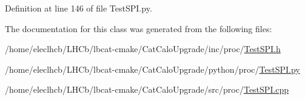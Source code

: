 Definition at line 146 of file Test\+S\+P\+I.\+py.



The documentation for this class was generated from the following files\+:\begin{DoxyCompactItemize}
\item 
/home/eleclhcb/\+L\+H\+Cb/lbcat-\/cmake/\+Cat\+Calo\+Upgrade/inc/proc/\hyperlink{TestSPI_8h}{Test\+S\+P\+I.\+h}\item 
/home/eleclhcb/\+L\+H\+Cb/lbcat-\/cmake/\+Cat\+Calo\+Upgrade/python/proc/\hyperlink{TestSPI_8py}{Test\+S\+P\+I.\+py}\item 
/home/eleclhcb/\+L\+H\+Cb/lbcat-\/cmake/\+Cat\+Calo\+Upgrade/src/proc/\hyperlink{TestSPI_8cpp}{Test\+S\+P\+I.\+cpp}\end{DoxyCompactItemize}
